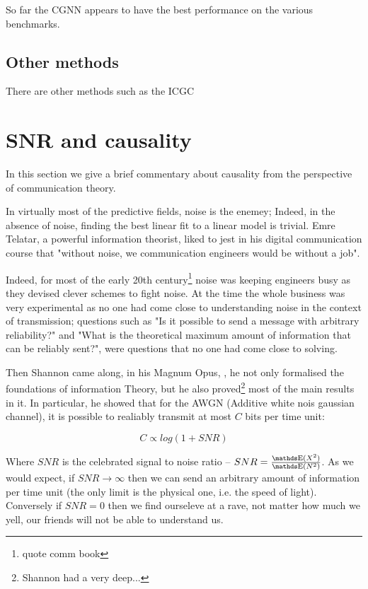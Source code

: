 So far the CGNN appears to have the best performance on the various benchmarks. 

\subsection{Other methods}

There are other methods such as the  ICGC


\section{SNR and causality}

In this section we give a brief commentary about causality from the perspective of communication theory.

In virtually most of the predictive fields, noise is the enemey; Indeed, in the absence of noise, finding the
best linear fit to a linear model is trivial. Emre Telatar, a powerful information theorist, liked to jest
in his digital communication course that "without noise, we communication engineers would be without a job".

Indeed, for most of the early 20th century\footnote{quote comm book} noise was keeping engineers busy as they 
devised clever schemes to fight noise. At the time the whole business was very experimental as
no one had come close to understanding noise in the context of transmission; questions such 
as "Is it possible to send a message with arbitrary reliability?" and "What is the theoretical maximum amount
of information that can be reliably sent?", were questions that no one had come close to solving.

Then Shannon came along, in his Magnum Opus, \cite{shannon}, he not only formalised the foundations of information
Theory, but he also proved\footnote{Shannon had a very deep...} most of the main results in it. In particular, he
showed that for the AWGN (Additive white nois gaussian channel), it is possible to realiably transmit at most $C$
bits per time unit:

$$
C \propto log(1 + SNR)
$$

Where $SNR$ is the celebrated signal to noise ratio -- $SNR = \frac{\E(X^2)}{\E(N^2)}$. As we 
would expect, if $SNR \rightarrow \infty$ then we can send an arbitrary amount of information 
per time unit (the only limit is the physical one, i.e. the speed of light). Conversely if $SNR = 0$
then we find ourseleve at a rave, not matter how much we yell, our friends will not be able to 
understand us.

